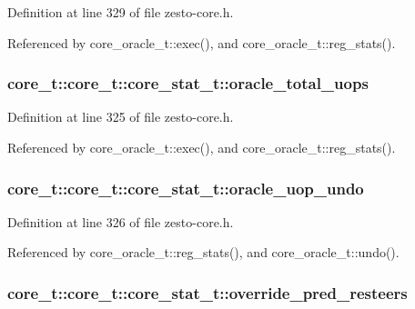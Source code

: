 Definition at line 329 of file zesto-core.h.

Referenced by core\_\-oracle\_\-t::exec(), and core\_\-oracle\_\-t::reg\_\-stats().
\subsubsection[{oracle\_\-total\_\-uops}]{ core\_\-t::core\_\-t::core\_\-stat\_\-t::oracle\_\-total\_\-uops}\label{structcore__t_1_1core__stat__t_9c6c4ccf8310d7a378ea90b01555d141}




Definition at line 325 of file zesto-core.h.

Referenced by core\_\-oracle\_\-t::exec(), and core\_\-oracle\_\-t::reg\_\-stats().
\subsubsection[{oracle\_\-uop\_\-undo}]{ core\_\-t::core\_\-t::core\_\-stat\_\-t::oracle\_\-uop\_\-undo}\label{structcore__t_1_1core__stat__t_73d06bc16b62c80eb6e6bb28f4494a98}




Definition at line 326 of file zesto-core.h.

Referenced by core\_\-oracle\_\-t::reg\_\-stats(), and core\_\-oracle\_\-t::undo().
\subsubsection[{override\_\-pred\_\-resteers}]{ core\_\-t::core\_\-t::core\_\-stat\_\-t::override\_\-pred\_\-resteers}\label{structcore__t_1_1core__stat__t_9659a7f298b4972f8ef8a91b35f5f0e8}




